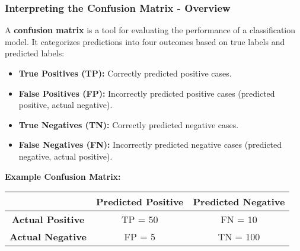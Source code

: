 \documentclass[aspectratio=169]{beamer}
\begin{document}
\begin{frame}[fragile]
    \frametitle{Interpreting the Confusion Matrix - Overview}
    A \textbf{confusion matrix} is a tool for evaluating the performance of a classification model. It categorizes predictions into four outcomes based on true labels and predicted labels:
    
    \begin{itemize}
        \item \textbf{True Positives (TP):} Correctly predicted positive cases.
        \item \textbf{False Positives (FP):} Incorrectly predicted positive cases (predicted positive, actual negative).
        \item \textbf{True Negatives (TN):} Correctly predicted negative cases.
        \item \textbf{False Negatives (FN):} Incorrectly predicted negative cases (predicted negative, actual positive).
    \end{itemize}
    
    \textbf{Example Confusion Matrix:}
    
    \begin{table}[ht]
        \centering
        \begin{tabular}{|c|c|c|}
            \hline
            & \textbf{Predicted Positive} & \textbf{Predicted Negative} \\
            \hline
            \textbf{Actual Positive} & TP = 50 & FN = 10 \\
            \hline
            \textbf{Actual Negative} & FP = 5 & TN = 100 \\
            \hline
        \end{tabular}
    \end{table}
\end{frame}
\end{document}
